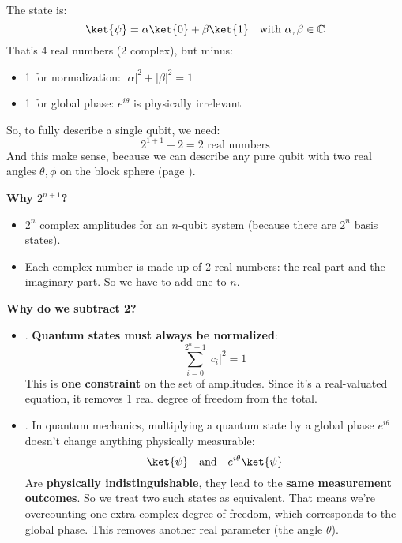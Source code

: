 \begin{itemize}
    \begin{examplebox}[: $n=1$ qubit]
        The state is:
        \begin{equation*}
            \ket{\psi} = \alpha\ket{0} + \beta\ket{1} \quad \text{with } \alpha, \beta \in \mathbb{C}
        \end{equation*}
        That's 4 real numbers (2 complex), but minus:
        \begin{itemize}
            \item 1 for normalization: $\left|\alpha\right|^{2} + \left|\beta\right|^{2} = 1$
            \item 1 for global phase: $e^{i\theta}$ is physically irrelevant
        \end{itemize}
        So, to fully describe a single qubit, we need:
        \begin{equation*}
            2^{1+1} - 2 = 2 \text{ real numbers}
        \end{equation*}
        And this make sense, because we can describe any pure qubit with two real angles $\theta, \phi$ on the block sphere (page \pageref{fig: Bloch sphere representation of qubit}).
    \end{examplebox}

    \textcolor{Green3}{ \textbf{Why $2^{n+1}$?}}
    \begin{itemize}
        \item $2^{n}$ complex amplitudes for an $n$-qubit system (because there are $2^{n}$ basis states).
        \item Each complex number is made up of 2 real numbers: the real part and the imaginary part. So we have to add one to $n$.
    \end{itemize}

    \textcolor{Green3}{ \textbf{Why do we subtract 2?}}
    \begin{itemize}
        \item {}. \textbf{Quantum states must always be normalized}:
        \begin{equation*}
            \displaystyle\sum_{i=0}^{2^{n}-1} \left|c_{i}\right|^{2} = 1
        \end{equation*}
        This is \textbf{one constraint} on the set of amplitudes. Since it's a real-valuated equation, it removes 1 real degree of freedom from the total.

        \item {}. In quantum mechanics, multiplying a quantum state by a global phase $e^{i\theta}$ doesn't change anything physically measurable:
        \begin{equation*}
            \ket{\psi} \quad \text{and} \quad e^{i\theta} \ket{\psi}
        \end{equation*}
        Are \textbf{physically indistinguishable}, they lead to the \textbf{same measurement outcomes}. So we treat two such states as equivalent. That means we're overcounting one extra complex degree of freedom, which corresponds to the global phase. This removes another real parameter (the angle $\theta$).
    \end{itemize}



\end{itemize}
